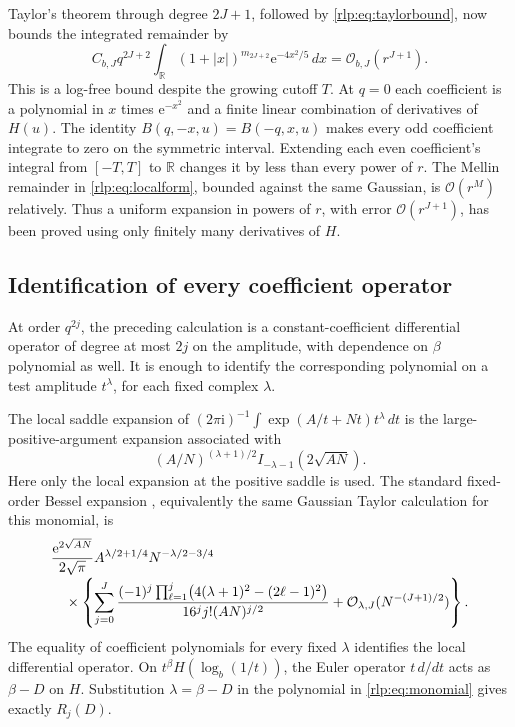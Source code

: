 \documentclass[11pt,letterpaper]{article}
\numberwithin{equation}{section}
\theoremstyle{remark}\newtheorem{remark}[theorem]{Remark}
\newcommand{\ii}{\mathrm i}
\newcommand{\ee}{\mathrm e}
\newcommand{\R}{\mathbb R}
\newcommand{\Ord}{\mathcal O}
\begin{document}
Taylor's theorem through degree $2J+1$, followed by \eqref{rlp:eq:taylorbound}, now bounds the integrated remainder by
\[
 C_{b,J}q^{2J+2}\int_\R(1+|x|)^{m_{2J+2}}\ee^{-4x^2/5}\,dx
 =\Ord_{b,J}(r^{J+1}).
\]
This is a log-free bound despite the growing cutoff $T$. At $q=0$ each coefficient is a polynomial in $x$ times $\ee^{-x^2}$ and a finite linear combination of derivatives of $H(u)$. The identity $B(q,-x,u)=B(-q,x,u)$ makes every odd coefficient integrate to zero on the symmetric interval. Extending each even coefficient's integral from $[-T,T]$ to $\R$ changes it by less than every power of $r$. The Mellin remainder in \eqref{rlp:eq:localform}, bounded against the same Gaussian, is $\Ord(r^M)$ relatively. Thus a uniform expansion in powers of $r$, with error $\Ord(r^{J+1})$, has been proved using only finitely many derivatives of $H$.

\subsection{Identification of every coefficient operator}
At order $q^{2j}$, the preceding calculation is a constant-coefficient differential operator of degree at most $2j$ on the amplitude, with dependence on $\beta$ polynomial as well. It is enough to identify the corresponding polynomial on a test amplitude $t^\lambda$, for each fixed complex $\lambda$.

The local saddle expansion of
$(2\pi\ii)^{-1}\int\exp(A/t+Nt)t^\lambda\,dt$
is the large-positive-argument expansion associated with
\[
 (A/N)^{(\lambda+1)/2} I_{-\lambda-1}(2\sqrt{AN}).
\]
Here only the local expansion at the positive saddle is used. The standard fixed-order Bessel expansion \cite[\S10.40]{dlmf}, equivalently the same Gaussian Taylor calculation for this monomial, is
\begin{align}
 &\frac{\ee^{2\sqrt{AN}}}{2\sqrt\pi}
 A^{\lambda/2+1/4}N^{-\lambda/2-3/4}\notag\\[-2pt]
 &\quad\times\left\{
 \sum_{j=0}^J
 \frac{(-1)^j\prod_{\ell=1}^j\bigl(4(\lambda+1)^2-(2\ell-1)^2\bigr)}
 {16^j j!(AN)^{j/2}}
 +\Ord_{\lambda,J}(N^{-(J+1)/2})\right\}.
 \label{rlp:eq:monomial}
\end{align}
The equality of coefficient polynomials for every fixed $\lambda$ identifies the local differential operator. On
$t^\beta H(\log_b(1/t))$, the Euler operator $t\,d/dt$ acts as $\beta-D$ on $H$. Substitution $\lambda=\beta-D$ in the polynomial in \eqref{rlp:eq:monomial} gives exactly $R_j(D)$.
\end{document}
